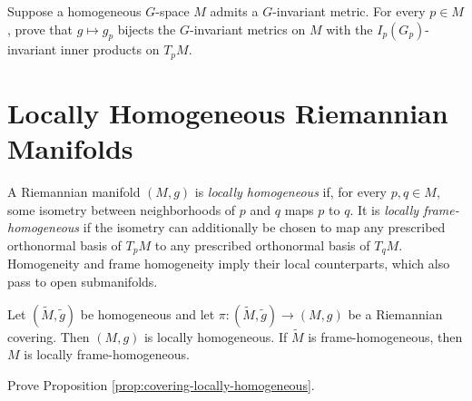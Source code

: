 \begin{exercise}
\label{exer:invariant-metrics-bijection}
Suppose a homogeneous $G$-space $M$ admits a $G$-invariant metric. For every
$p\in M$, prove that $g\mapsto g_p$ bijects the $G$-invariant metrics on $M$
with the $I_p(G_p)$-invariant inner products on $T_pM$.
\end{exercise}

\section{Locally Homogeneous Riemannian Manifolds}

A Riemannian manifold $(M,g)$ is \emph{locally homogeneous} if, for every
$p,q\in M$, some isometry between neighborhoods of $p$ and $q$ maps $p$ to
$q$. It is \emph{locally frame-homogeneous} if the isometry can additionally be
chosen to map any prescribed orthonormal basis of $T_pM$ to any prescribed
orthonormal basis of $T_qM$. Homogeneity and frame homogeneity imply their local
counterparts, which also pass to open submanifolds.

\begin{proposition}
\label{prop:covering-locally-homogeneous}
Let $(\widetilde M,\widetilde g)$ be homogeneous and let
$\pi\colon(\widetilde M,\widetilde g)\to(M,g)$ be a Riemannian covering. Then
$(M,g)$ is locally homogeneous. If $\widetilde M$ is frame-homogeneous, then
$M$ is locally frame-homogeneous.
\end{proposition}

\begin{exercise}
\label{exer:prove-locally-homogeneous-covering}
Prove Proposition \ref{prop:covering-locally-homogeneous}.
\end{exercise}

